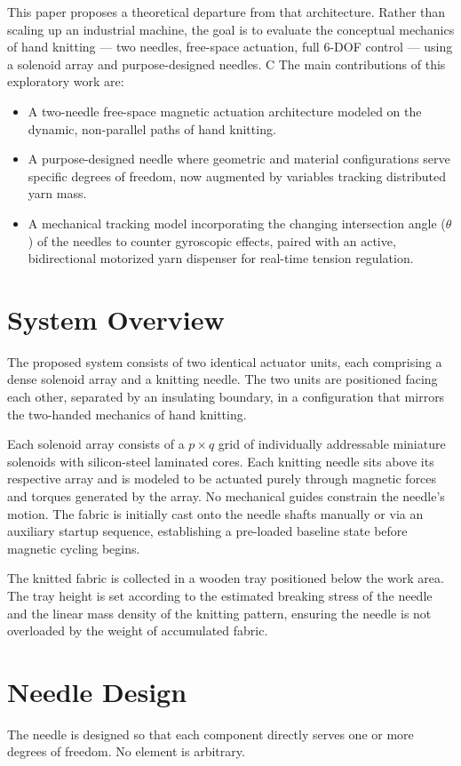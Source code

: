 \documentclass[10pt]{article}
\begin{document}
This paper proposes a theoretical departure from that architecture. Rather than scaling up an industrial machine, the goal is to evaluate the conceptual mechanics of hand knitting --- two needles, free-space actuation, full 6-DOF control --- using a solenoid array and purpose-designed needles. C The main contributions of this exploratory work are:
\begin{itemize}
  \item A two-needle free-space magnetic actuation architecture modeled on the dynamic, non-parallel paths of hand knitting.
  \item A purpose-designed needle where geometric and material configurations serve specific degrees of freedom, now augmented by variables tracking distributed yarn mass.
  \item A mechanical tracking model incorporating the changing intersection angle ($\theta$) of the needles to counter gyroscopic effects, paired with an active, bidirectional motorized yarn dispenser for real-time tension regulation.
\end{itemize}

\section{System Overview}
The proposed system consists of two identical actuator units, each comprising a dense solenoid array and a knitting needle. The two units are positioned facing each other, separated by an insulating boundary, in a configuration that mirrors the two-handed mechanics of hand knitting.

Each solenoid array consists of a $p\times q$ grid of individually addressable miniature solenoids with silicon-steel laminated cores. Each knitting needle sits above its respective array and is modeled to be actuated purely through magnetic forces and torques generated by the array. No mechanical guides constrain the needle's motion. The fabric is initially cast onto the needle shafts manually or via an auxiliary startup sequence, establishing a pre-loaded baseline state before magnetic cycling begins.

The knitted fabric is collected in a wooden tray positioned below the work area. The tray height is set according to the estimated breaking stress of the needle and the linear mass density of the knitting pattern, ensuring the needle is not overloaded by the weight of accumulated fabric.

\section{Needle Design}
The needle is designed so that each component directly serves one or more degrees of freedom. No element is arbitrary.
\end{document}
